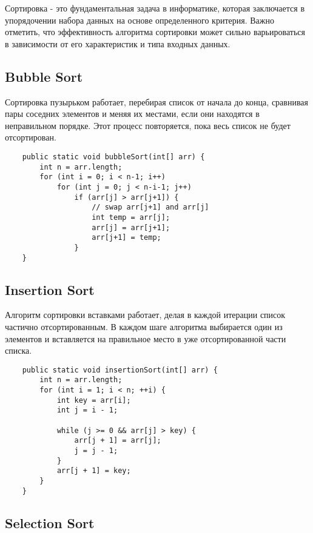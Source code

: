Сортировка - это фундаментальная задача в информатике, которая заключается в упорядочении набора данных на основе определенного критерия. Важно отметить, что эффективность алгоритма сортировки может сильно варьироваться в зависимости от его характеристик и типа входных данных.

\subsection*{Bubble Sort}

Сортировка пузырьком работает, перебирая список от начала до конца, сравнивая пары соседних элементов и меняя их местами, если они находятся в неправильном порядке. Этот процесс повторяется, пока весь список не будет отсортирован.


\begin{lstlisting}
    public static void bubbleSort(int[] arr) {
        int n = arr.length;
        for (int i = 0; i < n-1; i++)
            for (int j = 0; j < n-i-1; j++)
                if (arr[j] > arr[j+1]) {
                    // swap arr[j+1] and arr[j]
                    int temp = arr[j];
                    arr[j] = arr[j+1];
                    arr[j+1] = temp;
                }
    }
    \end{lstlisting}

\subsection*{Insertion Sort}

Алгоритм сортировки вставками работает, делая в каждой итерации список частично отсортированным. В каждом шаге алгоритма выбирается один из элементов и вставляется на правильное место в уже отсортированной части списка.


\begin{lstlisting}
    public static void insertionSort(int[] arr) {
        int n = arr.length;
        for (int i = 1; i < n; ++i) {
            int key = arr[i];
            int j = i - 1;
    
            while (j >= 0 && arr[j] > key) {
                arr[j + 1] = arr[j];
                j = j - 1;
            }
            arr[j + 1] = key;
        }
    }
    \end{lstlisting}

\subsection*{Selection Sort}

